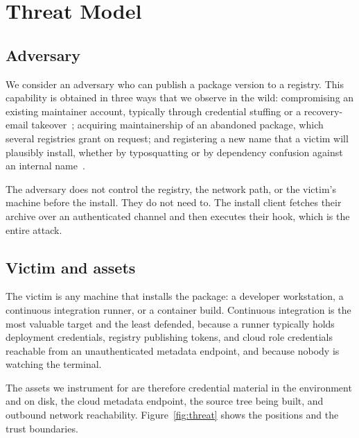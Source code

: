 \section{Threat Model}
\label{sec:threat-model}

\subsection{Adversary}

We consider an adversary who can publish a package version to a registry. This
capability is obtained in three ways that we observe in the wild: compromising
an existing maintainer account, typically through credential stuffing or a
recovery-email takeover~\citep{mbeki2022typosquat}; acquiring maintainership of
an abandoned package, which several registries grant on request; and
registering a new name that a victim will plausibly install, whether by
typosquatting or by dependency confusion against an internal
name~\citep{ferrante2021incidents}.

The adversary does not control the registry, the network path, or the victim's
machine before the install. They do not need to. The install client fetches
their archive over an authenticated channel and then executes their hook,
which is the entire attack.

\subsection{Victim and assets}

The victim is any machine that installs the package: a developer workstation, a
continuous integration runner, or a container build. Continuous integration is
the most valuable target and the least defended, because a runner typically
holds deployment credentials, registry publishing tokens, and cloud role
credentials reachable from an unauthenticated metadata endpoint, and because
nobody is watching the terminal.

The assets we instrument for are therefore credential material in the
environment and on disk, the cloud metadata endpoint, the source tree being
built, and outbound network reachability. Figure~\ref{fig:threat} shows the
positions and the trust boundaries.

